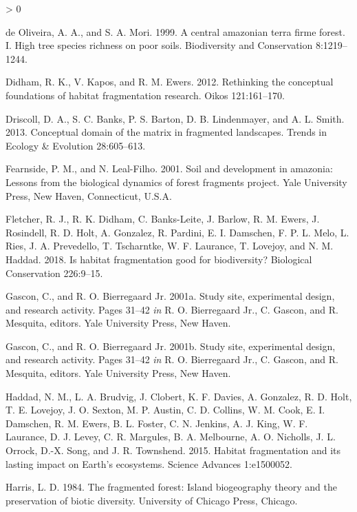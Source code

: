 \documentclass[
  english,
  man]{apa6}
\newlength{\cslhangindent}
\newenvironment{CSLReferences}[2] %
 {%
  \setlength{\parindent}{0pt}
  \ifodd #1 \everypar{\setlength{\hangindent}{\cslhangindent}}\ignorespaces\fi
  \ifnum #2 > 0
  \setlength{\parskip}{#2\baselineskip}
  \fi
 }%
 {}
\begin{document}
\begin{CSLReferences}{1}{0}
\leavevmode\hypertarget{ref-deoliveira1999}{}%
de Oliveira, A. A., and S. A. Mori. 1999. A central amazonian terra firme forest. I. High tree species richness on poor soils. Biodiversity and Conservation 8:1219--1244.

\leavevmode\hypertarget{ref-didham2012}{}%
Didham, R. K., V. Kapos, and R. M. Ewers. 2012. Rethinking the conceptual foundations of habitat fragmentation research. Oikos 121:161--170.

\leavevmode\hypertarget{ref-driscoll2013}{}%
Driscoll, D. A., S. C. Banks, P. S. Barton, D. B. Lindenmayer, and A. L. Smith. 2013. Conceptual domain of the matrix in fragmented landscapes. Trends in Ecology \& Evolution 28:605--613.

\leavevmode\hypertarget{ref-fearnside2001}{}%
Fearnside, P. M., and N. Leal-Filho. 2001. Soil and development in amazonia: Lessons from the biological dynamics of forest fragments project. Yale University Press, New Haven, Connecticut, U.S.A.

\leavevmode\hypertarget{ref-fletcher2018}{}%
Fletcher, R. J., R. K. Didham, C. Banks-Leite, J. Barlow, R. M. Ewers, J. Rosindell, R. D. Holt, A. Gonzalez, R. Pardini, E. I. Damschen, F. P. L. Melo, L. Ries, J. A. Prevedello, T. Tscharntke, W. F. Laurance, T. Lovejoy, and N. M. Haddad. 2018. Is habitat fragmentation good for biodiversity? Biological Conservation 226:9--15.

\leavevmode\hypertarget{ref-gascon2001}{}%
Gascon, C., and R. O. Bierregaard Jr. 2001a. Study site, experimental design, and research activity. Pages 31--42 \emph{in} R. O. Bierregaard Jr., C. Gascon, and R. Mesquita, editors. Yale University Press, New Haven.

\leavevmode\hypertarget{ref-gascon2001a}{}%
Gascon, C., and R. O. Bierregaard Jr. 2001b. Study site, experimental design, and research activity. Pages 31--42 \emph{in} R. O. Bierregaard Jr., C. Gascon, and R. Mesquita, editors. Yale University Press, New Haven.

\leavevmode\hypertarget{ref-haddad2015}{}%
Haddad, N. M., L. A. Brudvig, J. Clobert, K. F. Davies, A. Gonzalez, R. D. Holt, T. E. Lovejoy, J. O. Sexton, M. P. Austin, C. D. Collins, W. M. Cook, E. I. Damschen, R. M. Ewers, B. L. Foster, C. N. Jenkins, A. J. King, W. F. Laurance, D. J. Levey, C. R. Margules, B. A. Melbourne, A. O. Nicholls, J. L. Orrock, D.-X. Song, and J. R. Townshend. 2015. Habitat fragmentation and its lasting impact on Earth{'}s ecosystems. Science Advances 1:e1500052.

\leavevmode\hypertarget{ref-harris1984}{}%
Harris, L. D. 1984. The fragmented forest: Island biogeography theory and the preservation of biotic diversity. University of Chicago Press, Chicago.


\end{CSLReferences}
\end{document}
